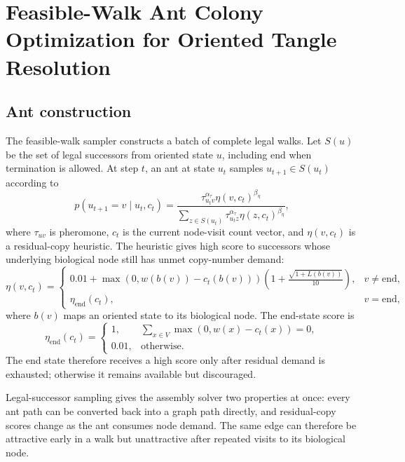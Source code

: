 \documentclass[11pt]{article}
\newcommand{\Vend}{\mathrm{end}}
\begin{document}
\section{Feasible-Walk Ant Colony Optimization for Oriented Tangle Resolution}

\subsection{Ant construction}

The feasible-walk sampler constructs a batch of complete legal walks. Let $S(u)$ be the set of legal successors from oriented state $u$, including $\Vend$ when termination is allowed. At step $t$, an ant at state $u_t$ samples $u_{t+1}\in S(u_t)$ according to
\begin{equation}
p(u_{t+1}=v\mid u_t,c_t)
=
\frac{\tau_{u_tv}^{\alpha_\tau} \eta(v,c_t)^{\beta_\eta}}
{\sum_{z\in S(u_t)} \tau_{u_tz}^{\alpha_\tau}\eta(z,c_t)^{\beta_\eta}},
\label{eq:aco-transition}
\end{equation}
where $\tau_{uv}$ is pheromone, $c_t$ is the current node-visit count vector, and $\eta(v,c_t)$ is a residual-copy heuristic. The heuristic gives high score to successors whose underlying biological node still has unmet copy-number demand:
\begin{equation}
\eta(v,c_t)=
\begin{cases}
0.01+\max(0,w(b(v))-c_t(b(v)))\left(1+\frac{\sqrt{1+L(b(v))}}{10}\right),
& v\neq \Vend,\\
\eta_{\mathrm{end}}(c_t),
& v=\Vend,
\end{cases}
\label{eq:residual-heuristic}
\end{equation}
where $b(v)$ maps an oriented state to its biological node. The end-state score is
\begin{equation}
\eta_{\mathrm{end}}(c_t)=
\begin{cases}
1, & \sum_{x\in V}\max(0,w(x)-c_t(x))=0,\\
0.01, & \text{otherwise}.
\end{cases}
\end{equation}
The end state therefore receives a high score only after residual demand is exhausted; otherwise it remains available but discouraged.

Legal-successor sampling gives the assembly solver two properties at once: every ant path can be converted back into a graph path directly, and residual-copy scores change as the ant consumes node demand. The same edge can therefore be attractive early in a walk but unattractive after repeated visits to its biological node.
\end{document}
